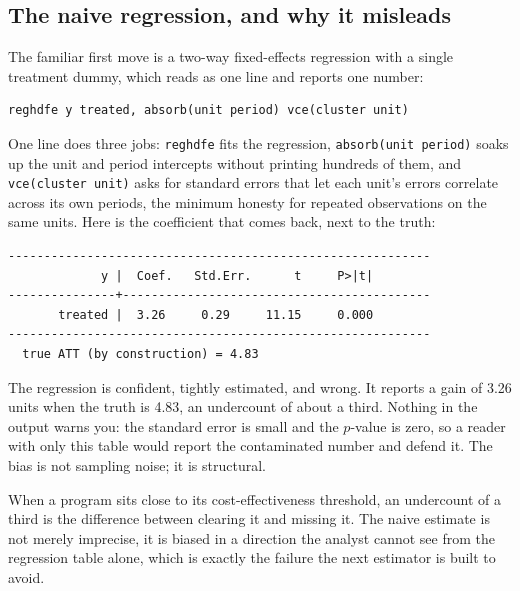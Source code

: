 \documentclass[
    a4paper,
    fontsize=10pt,
    twoside=true,
    numbers=noenddot,
]{kaobook}
\begin{document}
\subsection{The naive regression, and why it misleads}
The familiar first move is a two-way fixed-effects regression with a single treatment dummy, which reads as one line and reports one number:
\par
{\footnotesize
\begin{verbatim}
reghdfe y treated, absorb(unit period) vce(cluster unit)
\end{verbatim}
}
One line does three jobs: \texttt{reghdfe} fits the regression, \texttt{absorb(unit period)} soaks up the unit and period intercepts without printing hundreds of them, and \texttt{vce(cluster unit)} asks for standard errors that let each unit's errors correlate across its own periods, the minimum honesty for repeated observations on the same units. Here is the coefficient that comes back, next to the truth:
\par
{\footnotesize
\begin{verbatim}
-----------------------------------------------------------
             y |  Coef.   Std.Err.      t     P>|t|
---------------+-------------------------------------------
       treated |  3.26     0.29     11.15     0.000
-----------------------------------------------------------
  true ATT (by construction) = 4.83
\end{verbatim}
}
The regression is confident, tightly estimated, and wrong. It reports a gain of 3.26 units when the truth is 4.83, an undercount of about a third. Nothing in the output warns you: the standard error is small and the $p$-value is zero, so a reader with only this table would report the contaminated number and defend it. The bias is not sampling noise; it is structural.

When a program sits close to its cost-effectiveness threshold, an undercount of a third is the difference between clearing it and missing it. The naive estimate is not merely imprecise, it is biased in a direction the analyst cannot see from the regression table alone, which is exactly the failure the next estimator is built to avoid.
\end{document}
